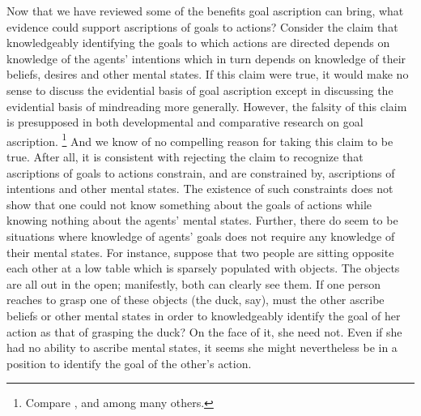 \documentclass[12pt,\papersize]{extarticle}
\begin{document}
Now that we have reviewed some of the benefits goal ascription can bring,
what evidence could support ascriptions of goals to actions?
Consider the claim that 
knowledgeably identifying the goals to which actions are directed
depends on 
knowledge of the agents' intentions
which in turn depends 
on knowledge of their beliefs, desires and other mental states.
If this claim were true,
it would make no sense to discuss the evidential basis of goal ascription except in discussing the evidential basis of mindreading more generally.
However,
the falsity of this claim  is presupposed  in both developmental and comparative research on goal ascription.%
\footnote{ 
Compare \citet{Gergely:1995sq},
	\citet{Woodward:1998dm} and
	\citet{Penn:2007ey}
among many others.
}
And we know of no compelling reason for taking this claim to be true.
After all,
it is consistent with rejecting the claim to recognize that
 ascriptions of goals to actions
 constrain, and are constrained by,
 ascriptions of intentions and other mental states.
The existence of such constraints does not show that one could 
not know something about the goals of actions 
while  knowing nothing about the agents' mental states.
Further,
there do seem to be situations where knowledge of agents' goals does not require any knowledge of their mental states.
For instance,
suppose that two people are sitting opposite each other at a low table
 which is 
sparsely populated with objects.
The objects are all out in the open; manifestly, both can clearly see them.
If one person reaches to grasp one of these objects (the duck, say), 
must the other ascribe beliefs or other mental states in order to knowledgeably identify the goal of her action as that of grasping the duck?
On the face of it, she need not.  
Even if she had no ability to ascribe mental states, it seems she might nevertheless be in a position to identify the goal of the other's action.
\end{document}
